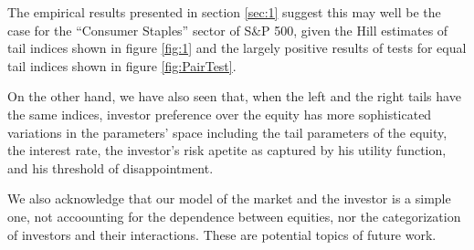 The empirical results presented in section \ref{sec:1} suggest this
may well be the case for the ``Consumer Staples'' sector of S\&P 500,
given the Hill estimates of tail indices shown in figure \ref{fig:1}
and the largely positive results of tests for equal tail indices shown
in figure \ref{fig:PairTest}.

On the other hand, we have also seen that, when the left and the right
tails have the same indices, investor preference over the equity has
more sophisticated variations in the parameters' space including the
tail parameters of the equity, the interest rate, the investor's risk
apetite as captured by his utility function, and his threshold of
disappointment.

We also acknowledge that our model of the market and the investor is a
simple one, not accoounting for the dependence between equities, nor
the categorization of investors and their interactions. These are
potential topics of future work.

